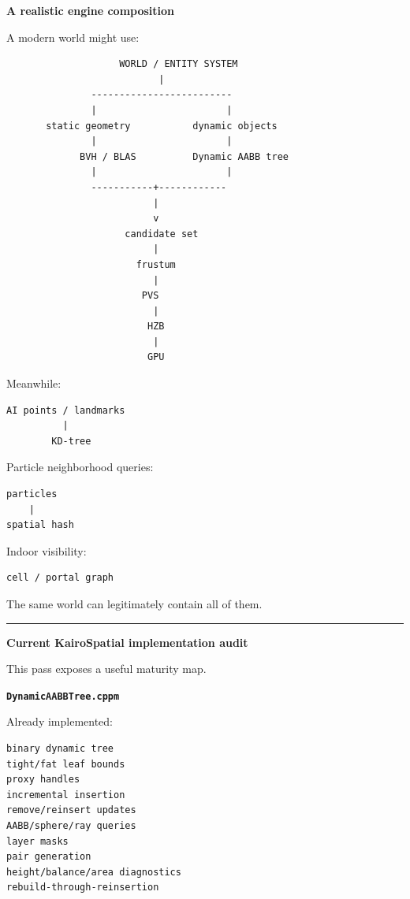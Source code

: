 \textbf{A realistic engine composition}

A modern world might use:

\begin{verbatim}
                    WORLD / ENTITY SYSTEM
                           |
               -------------------------
               |                       |
       static geometry           dynamic objects
               |                       |
             BVH / BLAS          Dynamic AABB tree
               |                       |
               -----------+------------
                          |
                          v
                     candidate set
                          |
                       frustum
                          |
                        PVS
                          |
                         HZB
                          |
                         GPU
\end{verbatim}

Meanwhile:

\begin{verbatim}
AI points / landmarks
          |
        KD-tree
\end{verbatim}

Particle neighborhood queries:

\begin{verbatim}
particles
    |
spatial hash
\end{verbatim}

Indoor visibility:

\begin{verbatim}
cell / portal graph
\end{verbatim}

The same world can legitimately contain all of them.

\begin{center}\rule{0.5\linewidth}{0.5pt}\end{center}

\textbf{Current KairoSpatial implementation audit}

This pass exposes a useful maturity map.

\textbf{\texttt{DynamicAABBTree.cppm}}

Already implemented:

\begin{verbatim}
binary dynamic tree
tight/fat leaf bounds
proxy handles
incremental insertion
remove/reinsert updates
AABB/sphere/ray queries
layer masks
pair generation
height/balance/area diagnostics
rebuild-through-reinsertion
\end{verbatim}

